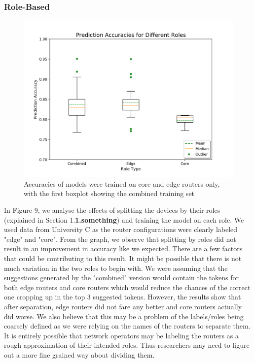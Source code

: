 \subsubsection{Role-Based}

\begin{figure}[H]
	\centering
	\includegraphics[width=\textwidth]{roles.png}
	\caption{Accuracies of models were trained on core and edge routers only, with the first boxplot showing the combined training set}
\end{figure}
In Figure 9, we analyse the effects of splitting the devices by their roles (explained in Section 1.\textbf{1.something}) and training the model on each role. We used data from University C as the router configurations were clearly labeled "edge" and "core". From the graph, we observe that splitting by roles did not result in an improvement in accuracy like we expected. There are a few factors that could be contributing to this result. It might be possible that there is not much variation in the two roles to begin with. We were assuming that the suggestions generated by the "combined" version would contain the tokens for both edge routers and core routers which would reduce the chances of the correct one cropping up in the top 3 suggested tokens. However, the results show that after separation, edge routers did not fare any better and core routers actually did worse. We also believe that this may be a problem of the labels/roles being coarsely defined as we were relying on the names of the routers to separate them. It is entirely possible that network operators may be labeling the routers as a rough approximation of their intended roles. Thus researchers may need to figure out a more fine grained way about dividing them.\\

